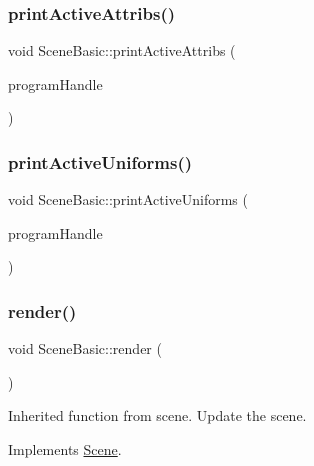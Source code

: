 \subsubsection{\texorpdfstring{print\+Active\+Attribs()}{printActiveAttribs()}}
{\footnotesize\ttfamily void Scene\+Basic\+::print\+Active\+Attribs (\begin{DoxyParamCaption}\item[{G\+Luint}]{program\+Handle }\end{DoxyParamCaption})}

\hypertarget{class_scene_basic_abe43716a4f7a637850f725fcf14d4e5f}{}\label{class_scene_basic_abe43716a4f7a637850f725fcf14d4e5f} 
\subsubsection{\texorpdfstring{print\+Active\+Uniforms()}{printActiveUniforms()}}
{\footnotesize\ttfamily void Scene\+Basic\+::print\+Active\+Uniforms (\begin{DoxyParamCaption}\item[{G\+Luint}]{program\+Handle }\end{DoxyParamCaption})}

\hypertarget{class_scene_basic_a8cfaad3ce6a4586e088b8d55d0e23ea6}{}\label{class_scene_basic_a8cfaad3ce6a4586e088b8d55d0e23ea6} 
\subsubsection{\texorpdfstring{render()}{render()}}
{\footnotesize\ttfamily void Scene\+Basic\+::render (\begin{DoxyParamCaption}{ }\end{DoxyParamCaption})\hspace{0.3cm}{\ttfamily [virtual]}}



Inherited function from scene. Update the scene. 



Implements \hyperlink{class_scene_a823f4cd60d27932ee16f74adb0421ff6}{Scene}.

\hypertarget{class_scene_basic_af8a829370fa5e7386f46b5b659f3a083}{}\label{class_scene_basic_af8a829370fa5e7386f46b5b659f3a083} 
